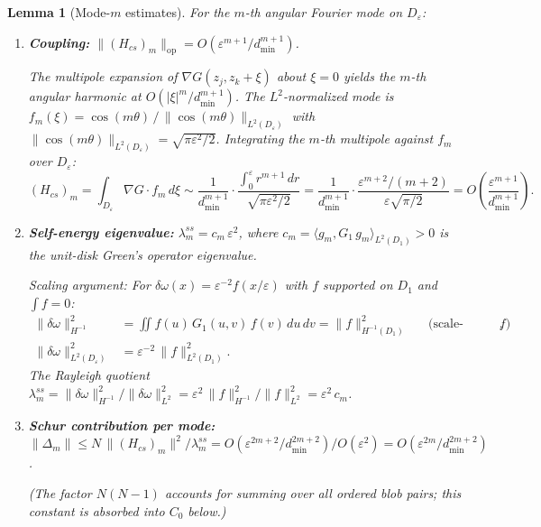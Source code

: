 \documentclass[11pt]{article}
\newtheorem{lemma}{Lemma}
\begin{document}
\begin{lemma}[Mode-$m$ estimates]
\label{lem:mode-estimates}
For the $m$-th angular Fourier mode on $D_\varepsilon$:
\begin{enumerate}
  \item[(a)] \textbf{Coupling:} $\|(H_{cs})_m\|_{\mathrm{op}}
    = O(\varepsilon^{m+1}/d_{\min}^{m+1})$.

    The multipole expansion of $\nabla G(z_j, z_k + \xi)$ about
    $\xi = 0$ yields the $m$-th angular harmonic at
    $O(|\xi|^m/d_{\min}^{m+1})$.  The $L^2$-normalized mode is
    $f_m(\xi) = \cos(m\theta)\,/\,
    \|{\cos(m\theta)}\|_{L^2(D_\varepsilon)}$
    with $\|\cos(m\theta)\|_{L^2(D_\varepsilon)}
    = \sqrt{\pi\varepsilon^2/2}$.
    Integrating the $m$-th multipole against $f_m$ over
    $D_\varepsilon$:
    \[
      (H_{cs})_m
      = \int_{D_\varepsilon} \nabla G \cdot f_m\,d\xi
      \sim \frac{1}{d_{\min}^{m+1}} \cdot
        \frac{\int_0^\varepsilon r^{m+1}\,dr}
             {\sqrt{\pi\varepsilon^2/2}}
      = \frac{1}{d_{\min}^{m+1}} \cdot
        \frac{\varepsilon^{m+2}/(m{+}2)}
             {\varepsilon\sqrt{\pi/2}}
      = O\!\left(\frac{\varepsilon^{m+1}}{d_{\min}^{m+1}}\right).
    \]

  \item[(b)] \textbf{Self-energy eigenvalue:}
    $\lambda_m^{ss} = c_m\,\varepsilon^2$, where
    $c_m = \langle g_m, G_1\,g_m \rangle_{L^2(D_1)} > 0$
    is the unit-disk Green's operator eigenvalue.

    \emph{Scaling argument:}
    For $\delta\omega(x) = \varepsilon^{-2}f(x/\varepsilon)$
    with $f$ supported on $D_1$ and $\int f = 0$:
    \begin{align*}
      \|\delta\omega\|_{H^{-1}}^2
      &= \iint f(u)\,G_1(u,v)\,f(v)\,du\,dv
        = \|f\|_{H^{-1}(D_1)}^2
        & &\text{(scale-invariant for mean-zero $f$)},\\
      \|\delta\omega\|_{L^2(D_\varepsilon)}^2
      &= \varepsilon^{-2}\,\|f\|_{L^2(D_1)}^2.
    \end{align*}
    The Rayleigh quotient
    $\lambda_m^{ss} = \|\delta\omega\|_{H^{-1}}^2 / \|\delta\omega\|_{L^2}^2
    = \varepsilon^2\,\|f\|_{H^{-1}}^2/\|f\|_{L^2}^2
    = \varepsilon^2\,c_m$.

  \item[(c)] \textbf{Schur contribution per mode:}
    $\|\Delta_m\| \le N\,\|(H_{cs})_m\|^2 / \lambda_m^{ss}
    = O(\varepsilon^{2m+2}/d_{\min}^{2m+2}) / O(\varepsilon^2)
    = O(\varepsilon^{2m}/d_{\min}^{2m+2})$.

    (The factor $N(N{-}1)$ accounts for summing over all
    ordered blob pairs; this constant is absorbed into $C_0$ below.)
\end{enumerate}
\end{lemma}
\end{document}
